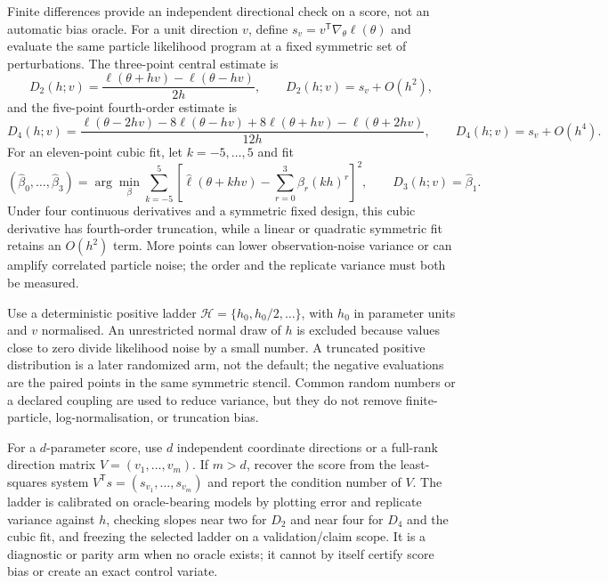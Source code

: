 \documentclass[11pt]{article}
\begin{document}
Finite differences provide an independent directional check on a score, not an
automatic bias oracle. For a unit direction $v$, define
$s_v=v^\mathsf T\nabla_\theta\ell(\theta)$ and evaluate the same particle
likelihood program at a fixed symmetric set of perturbations. The three-point
central estimate is
\begin{equation}
 D_2(h;v)=\frac{\ell(\theta+hv)-\ell(\theta-hv)}{2h},
 \qquad D_2(h;v)=s_v+O(h^2),
 \label{eq:fd-three-point}
\end{equation}
and the five-point fourth-order estimate is
\begin{equation}
 D_4(h;v)=\frac{\ell(\theta-2hv)-8\ell(\theta-hv)+8\ell(\theta+hv)-\ell(\theta+2hv)}{12h},
 \qquad D_4(h;v)=s_v+O(h^4).                    \label{eq:fd-five-point}
\end{equation}
For an eleven-point cubic fit, let $k=-5,\ldots,5$ and fit
\begin{equation}
 (\widehat\beta_0,\ldots,\widehat\beta_3)
 =\arg\min_\beta\sum_{k=-5}^{5}
 \left[\widehat\ell(\theta+khv)-\sum_{r=0}^{3}\beta_r(kh)^r\right]^2,
 \qquad D_3(h;v)=\widehat\beta_1.              \label{eq:fd-cubic-fit}
\end{equation}
Under four continuous derivatives and a symmetric fixed design, this cubic
derivative has fourth-order truncation, while a linear or quadratic symmetric
fit retains an $O(h^2)$ term. More points can lower observation-noise variance
or can amplify correlated particle noise; the order and the replicate variance
must both be measured.

Use a deterministic positive ladder $\mathcal H=\{h_0,h_0/2,\ldots\}$,
with $h_0$ in parameter units and $v$ normalised. An unrestricted normal draw
of $h$ is excluded because values close to zero divide likelihood noise by a
small number. A truncated positive distribution is a later randomized arm,
not the default; the negative evaluations are the paired points in the same
symmetric stencil. Common random numbers or a declared coupling are used to
reduce variance, but they do not remove finite-particle, log-normalisation, or
truncation bias.

For a $d$-parameter score, use $d$ independent coordinate directions or a
full-rank direction matrix $V=(v_1,\ldots,v_m)$. If $m>d$, recover the score
from the least-squares system $V^\mathsf T s=(s_{v_1},\ldots,s_{v_m})$ and
report the condition number of $V$. The ladder is calibrated on oracle-bearing
models by plotting error and replicate variance against $h$, checking slopes
near two for $D_2$ and near four for $D_4$ and the cubic fit, and freezing the
selected ladder on a validation/claim scope. It is a diagnostic or parity arm
when no oracle exists; it cannot by itself certify score bias or create an exact
control variate.
\end{document}
